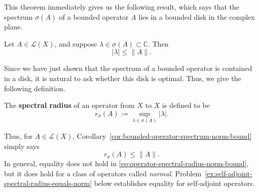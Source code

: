 This theorem immediately gives us the following result, which says that the spectrum $\sigma(A)$ of a bounded operator $A$ lies in a bounded disk in the complex plane.

\begin{Corollary}
\label{cor:bounded-operator-spectrum-norm-bound}
Let $A\in\mathcal{L}(X)$, and suppose $\lambda\in\sigma(A)\subset\mathbb{C}$. Then
\begin{equation}\label{eq:bounded-operator-spectrum-norm-bound}
|\lambda|\leq\|A\|.
\end{equation}

\end{Corollary}

\begingroup
{}
\renewcommand{\endProof}{\par\nobreak\hfill$\blacksquare$\par\vspace{0.1cm}}
\endgroup

Since we have just shown that the spectrum of a bounded operator is contained in a disk, it is natural to ask whether this disk is optimal. Thus, we give the following definition.

\begin{Definition}
\label{def:operator-spectral-radius}
The \textbf{spectral radius} of an operator from $X$ to $X$ is defined to be
\begin{equation}\label{eq:operator-spectral-radius-definition}
r_\sigma(A):=\sup_{\lambda\in\sigma(A)}|\lambda|.
\end{equation}

\end{Definition}

Thus, for $A\in\mathcal{L}(X)$, Corollary~\ref{cor:bounded-operator-spectrum-norm-bound} simply says
\begin{equation}\label{eq:operator-spectral-radius-norm-bound}
r_\sigma(A)\leq\|A\|.
\end{equation}
In general, equality does not hold in \eqref{eq:operator-spectral-radius-norm-bound}, but it does hold for a class of operators called \emph{normal}. Problem~\ref{ex:self-adjoint-spectral-radius-equals-norm} below establishes equality for self-adjoint operators.
